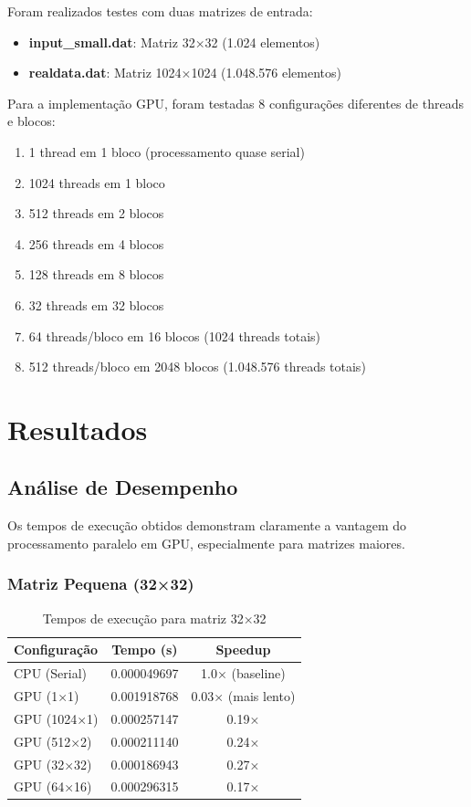 \documentclass{article}
\begin{document}
Foram realizados testes com duas matrizes de entrada:
\begin{itemize}
    \item \textbf{input\_small.dat}: Matriz 32×32 (1.024 elementos)
    \item \textbf{realdata.dat}: Matriz 1024×1024 (1.048.576 elementos)
\end{itemize}

Para a implementação GPU, foram testadas 8 configurações diferentes de threads e blocos:
\begin{enumerate}
    \item 1 thread em 1 bloco (processamento quase serial)
    \item 1024 threads em 1 bloco
    \item 512 threads em 2 blocos
    \item 256 threads em 4 blocos
    \item 128 threads em 8 blocos
    \item 32 threads em 32 blocos
    \item 64 threads/bloco em 16 blocos (1024 threads totais)
    \item 512 threads/bloco em 2048 blocos (1.048.576 threads totais)
\end{enumerate}

\section{Resultados}

\subsection{Análise de Desempenho}

Os tempos de execução obtidos demonstram claramente a vantagem do processamento paralelo em GPU, especialmente para matrizes maiores.

\subsubsection{Matriz Pequena (32×32)}

\begin{table}[H]
\centering
\begin{tabular}{lcc}
\toprule
\textbf{Configuração} & \textbf{Tempo (s)} & \textbf{Speedup} \\
\midrule
CPU (Serial) & 0.000049697 & 1.0× (baseline) \\
GPU (1×1) & 0.001918768 & 0.03× (mais lento) \\
GPU (1024×1) & 0.000257147 & 0.19× \\
GPU (512×2) & 0.000211140 & 0.24× \\
GPU (32×32) & 0.000186943 & 0.27× \\
GPU (64×16) & 0.000296315 & 0.17× \\
\bottomrule
\end{tabular}
\caption{Tempos de execução para matriz 32×32}
\end{table}
\end{document}
